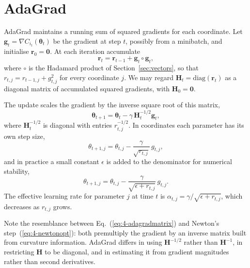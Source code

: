 \section{AdaGrad}
\label{sec:adagrad}

AdaGrad maintains a running sum of squared gradients for each coordinate.  Let
$\bm{g}_t=\nabla C_{i_t}(\bm{\theta}_t)$ be the gradient at step $t$, possibly
from a minibatch, and initialise $\bm{r}_0=\bm{0}$.  At each iteration
accumulate
\begin{equation}
  \bm{r}_t = \bm{r}_{t-1} + \bm{g}_t\circ\bm{g}_t,
  \label{eq:4-adagradaccum}
\end{equation}
where $\circ$ is the Hadamard product of Section~\ref{sec:vectors}, so that
$r_{t,j}=r_{t-1,j}+g_{t,j}^{2}$ for every coordinate $j$.  We may regard
$\bm{H}_t=\mathrm{diag}(\bm{r}_t)$ as a diagonal matrix of accumulated squared
gradients, with $\bm{H}_0=\bm{0}$.

The update scales the gradient by the inverse square root of this matrix,
\begin{equation}
  \bm{\theta}_{t+1} = \bm{\theta}_t - \gamma\,\bm{H}_t^{-1/2}\bm{g}_t,
  \label{eq:4-adagradmatrix}
\end{equation}
where $\bm{H}_t^{-1/2}$ is diagonal with entries $r_{t,j}^{-1/2}$.  In
coordinates each parameter has its own step size,
\begin{equation}
  \theta_{t+1,j} = \theta_{t,j} - \frac{\gamma}{\sqrt{r_{t,j}}}\,g_{t,j},
  \label{eq:4-adagradcoord}
\end{equation}
and in practice a small constant $\epsilon$ is added to the denominator for
numerical stability,
\begin{equation}
  \boxed{\;
  \theta_{t+1,j} = \theta_{t,j}
    - \frac{\gamma}{\sqrt{\epsilon + r_{t,j}}}\,g_{t,j} . \;}
  \label{eq:4-adagrad}
\end{equation}
The effective learning rate for parameter $j$ at time $t$ is
$\alpha_{t,j}=\gamma/\sqrt{\epsilon+r_{t,j}}$, which decreases as $r_{t,j}$
grows.

Note the resemblance between Eq.~(\ref{eq:4-adagradmatrix}) and Newton's
step~(\ref{eq:4-newtonopt}): both premultiply the gradient by an inverse
matrix built from curvature information.  AdaGrad differs in using
$\bm{H}^{-1/2}$ rather than $\bm{H}^{-1}$, in restricting $\bm{H}$ to be
diagonal, and in estimating it from gradient magnitudes rather than second
derivatives.

